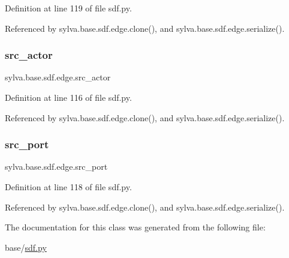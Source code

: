 Definition at line 119 of file sdf.\+py.



Referenced by sylva.\+base.\+sdf.\+edge.\+clone(), and sylva.\+base.\+sdf.\+edge.\+serialize().

\mbox{\label{classsylva_1_1base_1_1sdf_1_1edge_adab5e4935ad5cdd09b2c8859ea183513}} 
\subsubsection{\texorpdfstring{src\+\_\+actor}{src\_actor}}
{\footnotesize\ttfamily sylva.\+base.\+sdf.\+edge.\+src\+\_\+actor}



Definition at line 116 of file sdf.\+py.



Referenced by sylva.\+base.\+sdf.\+edge.\+clone(), and sylva.\+base.\+sdf.\+edge.\+serialize().

\mbox{\label{classsylva_1_1base_1_1sdf_1_1edge_a8df512cfa9966c1bf78dc8fb584aefce}} 
\subsubsection{\texorpdfstring{src\+\_\+port}{src\_port}}
{\footnotesize\ttfamily sylva.\+base.\+sdf.\+edge.\+src\+\_\+port}



Definition at line 118 of file sdf.\+py.



Referenced by sylva.\+base.\+sdf.\+edge.\+clone(), and sylva.\+base.\+sdf.\+edge.\+serialize().



The documentation for this class was generated from the following file\+:\begin{DoxyCompactItemize}
\item 
base/\hyperlink{sdf_8py}{sdf.\+py}\end{DoxyCompactItemize}
